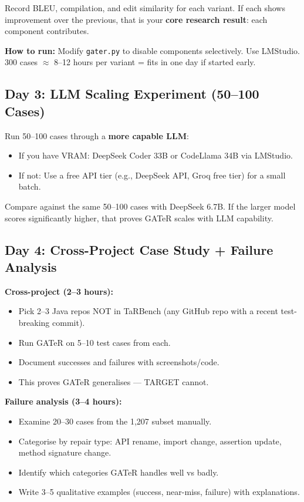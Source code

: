 \documentclass[11pt,a4paper]{article}
\begin{document}
Record BLEU, compilation, and edit similarity for each variant.
If each shows improvement over the previous, that is your
\textbf{core research result}: each component contributes.

\textbf{How to run:} Modify \texttt{gater.py} to disable
components selectively.  Use LMStudio.  300 cases $\approx$
8--12 hours per variant = fits in one day if started early.

\subsection*{Day 3: LLM Scaling Experiment (50--100 Cases)}

Run 50--100 cases through a \textbf{more capable LLM}:
\begin{itemize}[nosep,leftmargin=1.5em]
  \item If you have VRAM: DeepSeek Coder 33B or CodeLlama 34B
        via LMStudio.
  \item If not: Use a free API tier (e.g., DeepSeek API,
        Groq free tier) for a small batch.
\end{itemize}

Compare against the same 50--100 cases with DeepSeek 6.7B.
If the larger model scores significantly higher, that proves
GATeR scales with LLM capability.

\subsection*{Day 4: Cross-Project Case Study + Failure Analysis}

\textbf{Cross-project (2--3 hours):}
\begin{itemize}[nosep,leftmargin=1.5em]
  \item Pick 2--3 Java repos NOT in TaRBench (any GitHub repo
        with a recent test-breaking commit).
  \item Run GATeR on 5--10 test cases from each.
  \item Document successes and failures with screenshots/code.
  \item This proves GATeR generalises --- TARGET cannot.
\end{itemize}

\textbf{Failure analysis (3--4 hours):}
\begin{itemize}[nosep,leftmargin=1.5em]
  \item Examine 20--30 cases from the 1,207 subset manually.
  \item Categorise by repair type: API rename, import change,
        assertion update, method signature change.
  \item Identify which categories GATeR handles well vs badly.
  \item Write 3--5 qualitative examples (success, near-miss,
        failure) with explanations.
\end{itemize}
\end{document}
